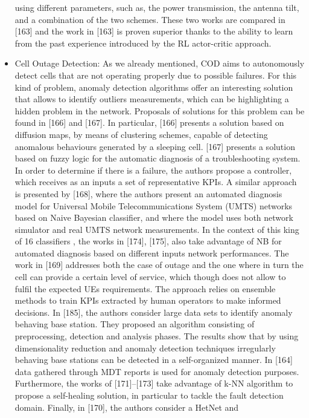 \documentclass[12pt]{article}
\begin{document}
\begin{itemize}
	using different parameters, such as, the power transmission,
	the antenna tilt, and a combination of the two schemes. These
	two works are compared in [163] and the work in [163] is
	proven superior thanks to the ability to learn from the past
	experience introduced by the RL actor-critic approach.
	\item Cell Outage Detection: As we already mentioned, COD
	aims to autonomously detect cells that are not operating
	properly due to possible failures. For this kind of problem,
	anomaly detection algorithms offer an interesting solution
	that allows to identify outliers measurements, which can be
	highlighting a hidden problem in the network. Proposals of
	solutions for this problem can be found in [166] and [167]. In
	particular, [166] presents a solution based on diffusion maps,
	by means of clustering schemes, capable of detecting anomalous
	behaviours generated by a sleeping cell. [167] presents
	a solution based on fuzzy logic for the automatic diagnosis
	of a troubleshooting system. In order to determine if there is
	a failure, the authors propose a controller, which receives as
	an inputs a set of representative KPIs. A similar approach is
	presented by [168], where the authors present an automated
	diagnosis model for Universal Mobile Telecommunications
	System (UMTS) networks based on Naive Bayesian classifier,
	and where the model uses both network simulator and real
	UMTS network measurements. In the context of this king of
	16
	classifiers , the works in [174], [175], also take advantage of
	NB for automated diagnosis based on different inputs network
	performances. The work in [169] addresses both the case
	of outage and the one where in turn the cell can provide
	a certain level of service, which though does not allow to
	fulfil the expected UEs requirements. The approach relies on
	ensemble methods to train KPIs extracted by human operators
	to make informed decisions. In [185], the authors consider
	large data sets to identify anomaly behaving base station. They
	proposed an algorithm consisting of preprocessing, detection
	and analysis phases. The results show that by using dimensionality
	reduction and anomaly detection techniques irregularly
	behaving base stations can be detected in a self-organized
	manner. In [164] data gathered through MDT reports is used
	for anomaly detection purposes. Furthermore, the works of
	[171]–[173] take advantage of k-NN algorithm to propose a
	self-healing solution, in particular to tackle the fault detection
	domain. Finally, in [170], the authors consider a HetNet and

\end{itemize}
\end{document}
